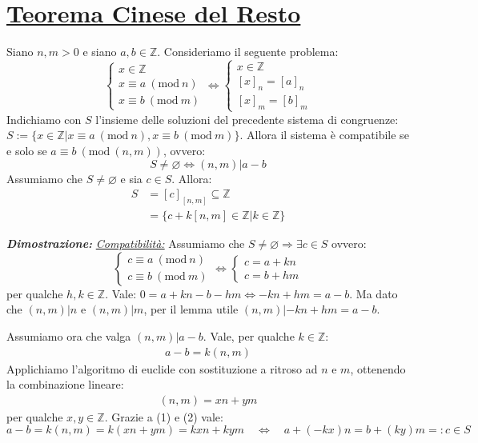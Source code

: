 \documentclass[oneside]{book}
\theoremstyle{remark}
\newcommand{\teorema}[1]{\section{\underline{#1}}}
\newcommand{\Mod}[1]{\ (\mathrm{mod}\ #1)} %
\begin{document}
\teorema{Teorema Cinese del Resto}
\begin{tcolorbox}[title={Teorema cinese del resto}]
Siano $n,m>0$ e siano $a,b \in \mathbb{Z}$. Consideriamo il seguente problema:
\[
    \begin{cases}
        x \in \mathbb{Z}\\
        x \equiv a \Mod{n}\\
        x \equiv b \Mod{m}
    \end{cases}
    \Longleftrightarrow
    \begin{cases}
        x \in \mathbb{Z}\\
        [x]_n = [a]_n\\
        [x]_m = [b]_m
    \end{cases}
\]
Indichiamo con $S$ l'insieme delle soluzioni del precedente sistema di congruenze:\\
$S:=\{ x \in \mathbb{Z}| x \equiv a \Mod{n}, x \equiv b \Mod{m} \}$.
Allora il sistema è compatibile se e solo se $a \equiv b \Mod{(n,m)}$, ovvero:
\[ S\not = \varnothing \Longleftrightarrow (n,m)|a-b \]
Assumiamo che $S \not = \varnothing$ e sia $c\in S$. Allora:
\begin{align*}
    S &=[c]_{[n,m]} \subseteq \mathbb{Z}\\
    &=\{ c+k[n,m] \in \mathbb{Z}| k \in \mathbb{Z} \}
\end{align*}

\emph{\textbf{Dimostrazione:}} \underline{\emph{Compatibilità:}} Assumiamo che
$S \not = \varnothing \Rightarrow \exists c \in S$ ovvero:
\[
    \begin{cases}
        c \equiv a \Mod{n}\\
        c \equiv b \Mod{m}
    \end{cases}
    \Longleftrightarrow
    \begin{cases}
        c = a+kn\\
        c = b+hm
    \end{cases}
\]
per qualche $h,k \in \mathbb{Z}$. Vale: $ 0 = a+kn - b-hm \Leftrightarrow -kn+hm = a-b $.
Ma dato che $(n,m)|n$ e $(n,m)|m$, per il lemma utile $(n,m)|-kn+hm = a-b$.

Assumiamo ora che valga $(n,m)|a-b$. Vale, per qualche $k \in \mathbb{Z}$:
\begin{align}
    a-b = k(n,m)
\end{align}
Applichiamo l'algoritmo di euclide con sostituzione a ritroso ad $n$ e $m$, ottenendo la
combinazione lineare:
\begin{align}
    (n,m) = xn+ym
\end{align}
per qualche $x,y \in \mathbb{Z}$. Grazie a (1) e (2) vale:
\[ a-b=k(n,m)=k(xn+ym)=kxn+kym \quad \Longleftrightarrow \quad a+(-kx)n=b+(ky)m =: c \in S \]


\end{tcolorbox}
\end{document}
